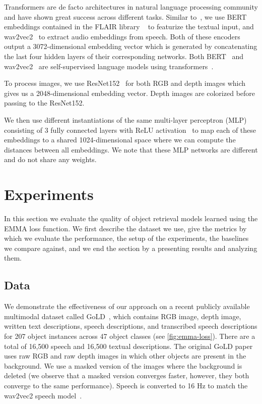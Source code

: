\documentclass[10pt]{article} %
\begin{document}
Transformers are de facto architectures in natural language processing community and have shown great success across different tasks. Similar to~\citet{GoLD_UMBC}, we use BERT~\cite{devlin-etal-2019-bert} embeddings contained in the FLAIR library ~\cite{akbik2019flair,akbik-etal-2019-pooled} to featurize the textual input, and wav2vec2~\cite{wav2vec2} to extract audio embeddings from speech. Both of these encoders output a 3072-dimensional embedding vector which is generated by concatenating the last four hidden layers of their corresponding networks. Both BERT~\cite{devlin-etal-2019-bert} and wav2vec2~\cite{wav2vec2} are self-supervised language models using transformers~\cite{vaswani2017attention}.

To process images, we use ResNet152~\cite{He_resnet_2016} for both RGB and depth images which gives us a 2048-dimensional embedding vector. Depth images are colorized before passing to the ResNet152.

We then use different instantiations of the same multi-layer perceptron (MLP) consisting of 3 fully connected layers with ReLU activation~\cite{relu2010} to map each of these embeddings to a shared 1024-dimensional space where we can compute the distances between all embeddings. We note that these MLP networks are different and do not share any weights.






\section{Experiments}
\label{sec:Experiments}

In this section we evaluate the quality of object retrieval models learned using the EMMA loss function. We first describe the dataset we use, give the metrics by which we evaluate the performance, the setup of the experiments, the baselines we compare against, and we end the section by a presenting results and analyzing them.

\subsection{Data}
\label{sec:Data}

We demonstrate the effectiveness of our approach on a recent publicly available multimodal dataset called GoLD~\cite{GoLD_UMBC}, which contains RGB image, depth image, written text descriptions, speech descriptions, and transcribed speech descriptions for 207 object instances across 47 object classes (see \cref{fig:emma-loss}). There are a total of 16,500 speech and 16,500 textual descriptions. The original GoLD paper uses raw RGB and raw depth images in which other objects are present in the background. We use a masked version of the images where the background is deleted (we observe that a masked version converges faster, however, they both converge to the same performance). Speech is converted to 16 Hz to match the wav2vec2 speech model~\cite{wav2vec2}.
\end{document}
